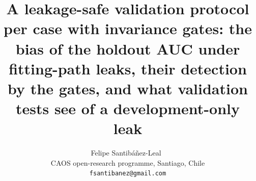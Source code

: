 \documentclass[11pt]{article}
\title{A leakage-safe validation protocol per case with invariance gates: the bias of the holdout AUC under fitting-path leaks, their detection by the gates, and what validation tests see of a development-only leak}
\author{Felipe Santib\'a\~nez-Leal~\orcidlink{0000-0002-0150-3246}\\
\small CAOS open-research programme, Santiago, Chile\\
\small \texttt{fsantibanez@gmail.com}}
\date{\docdate}
\theoremstyle{plain}
\begin{document}
\maketitle
\headerblock

\begin{abstract}

\end{abstract}
















\end{document}
